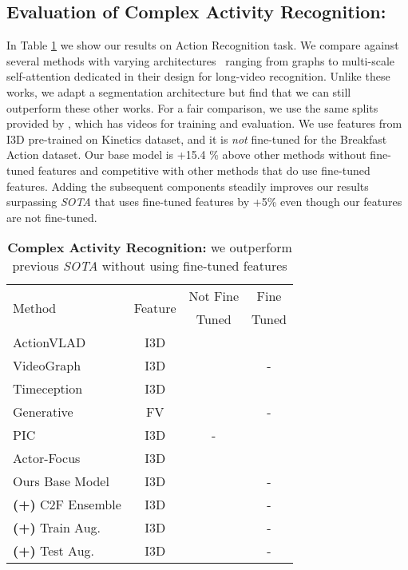 \documentclass[10pt,twocolumn,letterpaper]{article}
\begin{document}
\subsection{Evaluation of Complex Activity Recognition:} In Table \ref{tab:high-level-action-results} we show our results on Action Recognition task.  We compare against several methods with varying architectures~\cite{highlevel-girdhar2017actionvlad, highlevel-hussein2019videograph,highlevel-hussein2019timeception, highlevel-hussein2020pic} ranging from graphs to multi-scale self-attention dedicated in their design for long-video recognition. Unlike these works, we adapt a segmentation architecture but find that we can still outperform these other works. For a fair comparison, we use the same splits provided by \cite{highlevel-hussein2019videograph, highlevel-hussein2019timeception, highlevel-hussein2020pic}, which has  videos for training and evaluation. We use features from I3D pre-trained on Kinetics \cite{carreira2017quo} dataset, and it is \textit{not} fine-tuned for the Breakfast Action dataset. Our base model is +15.4 \% above other methods without fine-tuned features and competitive with other methods that do use fine-tuned features. Adding the subsequent components steadily improves our results surpassing \textit{SOTA} that uses fine-tuned  features by +5\% even though our features are not fine-tuned.  


\begin{table}
\begin{center}
\small{
\begin{tabular}{l| c c c} 
\hline
\multirow{2}{*}{Method} & \multirow{2}{*}{Feature} & Not Fine & Fine\\
& &  Tuned & Tuned\\
\hline
\hline
ActionVLAD \cite{highlevel-girdhar2017actionvlad} & I3D &  &  \\
VideoGraph \cite{highlevel-hussein2019videograph} & I3D &  & - \\
Timeception \cite{highlevel-hussein2019timeception} & I3D &  &  \\
Generative \cite{highlevel-kuehne2016end} & FV \cite{IDT-wang2013action} &  & - \\
PIC \cite{highlevel-hussein2020pic} & I3D & - &  \\
Actor-Focus \cite{highlevel-ballan2021long} & I3D &  &  \\
\hline
Ours Base Model & I3D &  & -\\
\textbf{(+)} C2F Ensemble & I3D &  & - \\
\textbf{(+)} Train Aug. & I3D &  & - \\
\textbf{(+)} Test Aug. & I3D &  & - \\
\hline\hline
\end{tabular}
}
\end{center}
\caption{\textbf{Complex Activity Recognition:} we outperform previous \textit{SOTA} without using fine-tuned features}
\label{tab:high-level-action-results}
\end{table}
\end{document}
